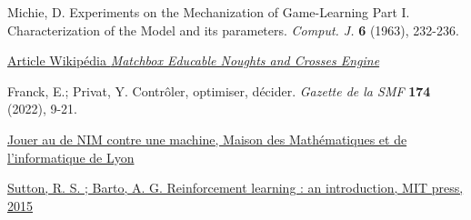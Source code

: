 \documentclass[a4paper,12pt]{article}
\begin{document}
\begin{thebibliography}{Références}
\label{ruxe9fuxe9rences}

\newblock Michie, D. Experiments on the Mechanization of Game-Learning Part I.
  Characterization of the Model and its parameters. 
  \emph{Comput. J.} \textbf{6} (1963), 232-236.

\newblock \href{https://en.wikipedia.org/wiki/Matchbox_Educable_Noughts_and_Crosses_Engine}{Article Wikipédia \emph{Matchbox Educable Noughts and Crosses Engine}}
  
\newblock Franck, E.; Privat, Y. Contrôler, optimiser, décider. \emph{Gazette de la SMF} \textbf{174} (2022), 9-21.
  
\newblock \href{https://mmi-lyon.fr/jouer-au-jeu-de-nim-contre-une-machine}{Jouer au de NIM contre une machine, Maison des Mathématiques et de l'informatique de Lyon}
  
\newblock \href{https://web.stanford.edu/class/psych209/Readings/SuttonBartoIPRLBook2ndEd.pdf}{Sutton,  R. S. ; Barto, A. G. Reinforcement learning : an introduction, MIT press, 2015}
\end{thebibliography}
\end{document}
